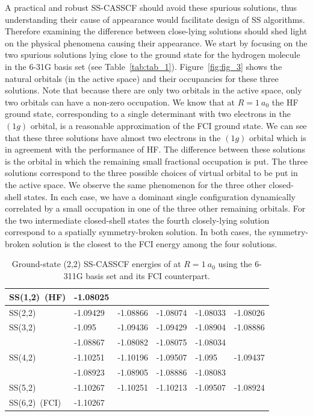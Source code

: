 \documentclass[aps,prb,reprint,showkeys,superscriptaddress]{revtex4-1}
\begin{document}
A practical and robust SS-CASSCF should avoid these spurious solutions, thus understanding their cause of appearance would facilitate design of SS algorithms.
Therefore examining the difference between close-lying solutions should shed light on the physical phenomena causing their appearance.
We start by focusing on the two spurious solutions lying close to the ground state for the hydrogen molecule in the 6-31G basis set (see Table~\ref{tab:tab_1}).
Figure~\ref{fig:fig_3} shows the natural orbitals (in the active space) and their occupancies for these three solutions.
Note that because there are only two orbitals in the active space, only two orbitals can have a non-zero occupation.
We know that at $R=1~a_0$ the HF ground state, corresponding to a single determinant with two electrons in the $(1g)$ orbital, is a reasonable approximation of the FCI ground state.
We can see that these three solutions have almost two electrons in the $(1g)$ orbital which is in agreement with the performance of HF.
The difference between these solutions is the orbital in which the remaining small fractional occupation is put.
The three solutions correspond to the three possible choices of virtual orbital to be put in the active space.
We observe the same phenomenon for the three other closed-shell states.
In each case, we have a dominant single configuration dynamically correlated by a small occupation in one of the three other remaining orbitals.
For the two intermediate closed-shell states the fourth closely-lying solution correspond to a spatially symmetry-broken solution.
In both cases, the symmetry-broken solution is the closest to the FCI energy among the four solutions.

\begin{table}[b]
  \caption{Ground-state (2,2) SS-CASSCF energies of  at $R=1~a_0$ using the 6-311G basis set and its FCI counterpart.}
  \begin{ruledtabular}
    \label{tab:tab_2}
    \begin{tabular}{llllll}
      SS(1,2)~(HF) & -1.08025 & & & &\\
      \hline
      SS(2,2) & -1.09429 & -1.08866 & -1.08074 & -1.08033 & -1.08026 \\
      \hline
      SS(3,2) & -1.095 & -1.09436 & -1.09429 & -1.08904 & -1.08886 \\
                   & -1.08867 & -1.08082 & -1.08075 & -1.08034 & \\
      \hline
      SS(4,2) & -1.10251 & -1.10196 & -1.09507 & -1.095 & -1.09437 \\
          & -1.08923 & -1.08905 & -1.08886 & -1.08083 &  \\
      \hline
      SS(5,2) & -1.10267 & -1.10251 & -1.10213 & -1.09507 & -1.08924 \\
      \hline
      SS(6,2)~(FCI) & -1.10267 & & & &\\
    \end{tabular}
  \end{ruledtabular}
\end{table}
\end{document}
